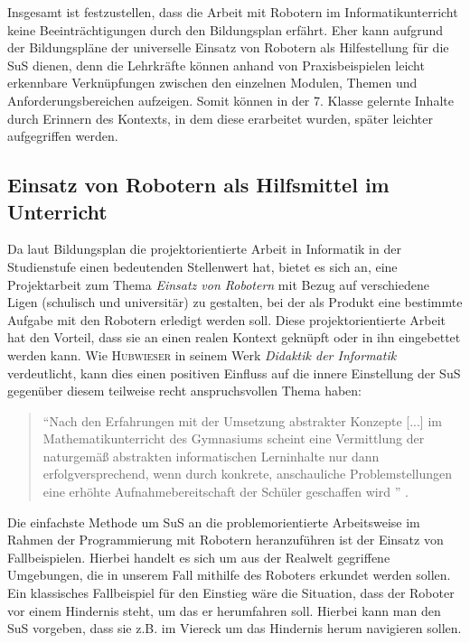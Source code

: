 \documentclass[paper=a4, DIV=calc, BCOR=12mm, twoside=on, onecolumn=on, open = right, titlepage =on, parskip =half-, headsepline = on, footsepline = off, chapterprefix = off, appendixprefix = on, fontsize = 12pt, numbers = noenddot, abstract = on]{scrbook}
\begin{document}
Insgesamt ist festzustellen, dass die Arbeit mit Robotern im Informatikunterricht keine Beeinträchtigungen durch den Bildungsplan erfährt. Eher kann aufgrund der Bildungspläne der universelle Einsatz von Robotern als Hilfestellung für die SuS dienen, denn die Lehrkräfte können anhand von Praxisbeispielen leicht erkennbare Verknüpfungen zwischen den einzelnen Modulen, Themen und Anforderungsbereichen aufzeigen. Somit können in der 7. Klasse gelernte Inhalte durch Erinnern des Kontexts, in dem diese erarbeitet wurden, später leichter aufgegriffen werden.


\subsection{Einsatz von Robotern als Hilfsmittel im Unterricht}
Da laut Bildungsplan die projektorientierte Arbeit in Informatik in der Studienstufe einen bedeutenden Stellenwert hat, bietet es sich an, eine Projektarbeit zum Thema \emph{Einsatz von Robotern} mit Bezug auf verschiedene Ligen (schulisch und universitär) zu gestalten, bei der als Produkt eine bestimmte Aufgabe mit den Robotern erledigt werden soll.  Diese projektorientierte Arbeit hat den Vorteil, dass sie an einen realen Kontext geknüpft oder in ihn eingebettet werden kann. Wie \textsc{Hubwieser} in seinem Werk \emph{Didaktik der Informatik} verdeutlicht, kann dies einen positiven Einfluss auf die innere Einstellung der SuS gegenüber diesem teilweise recht anspruchsvollen Thema haben:
\begin{quote}
"`Nach den Erfahrungen mit der Umsetzung abstrakter Konzepte [...] im Mathematikunterricht des Gymnasiums scheint eine Vermittlung der naturgemäß abstrakten informatischen Lerninhalte nur dann erfolgversprechend, wenn durch konkrete, anschauliche Problemstellungen eine erhöhte Aufnahmebereitschaft der Schüler geschaffen wird "' \cite[S.68]{hubwieser:07}.
\end{quote}

Die einfachste Methode um SuS an die problemorientierte Arbeitsweise im Rahmen der Programmierung mit Robotern heranzuführen ist der Einsatz von Fallbeispielen. Hierbei handelt es sich um aus der Realwelt gegriffene Umgebungen, die in unserem Fall mithilfe des Roboters erkundet werden sollen. Ein klassisches Fallbeispiel für den Einstieg wäre die Situation, dass der Roboter vor einem Hindernis steht, um das er herumfahren soll. Hierbei kann man den SuS vorgeben, dass sie z.B. im Viereck um das Hindernis herum navigieren sollen.
\end{document}
